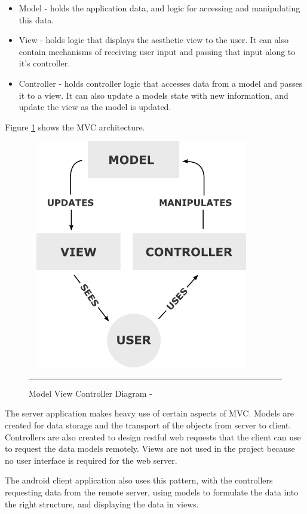 \begin{itemize}
	\item Model - holds the application data, and logic  for accessing and manipulating this data.
	\item View - holds logic that displays the aesthetic view to the user. It can also contain mechanisms of receiving user input and passing that input along to it's controller.
	\item Controller - holds controller logic that accesses data from a model and passes it to a view. It can also update a models state with new information, and update the view as the model is updated.
\end{itemize}

Figure \ref{fig:mvc} shows the MVC architecture.

\begin{figure}[htbp]
	\centering
\includegraphics[width=10cm,height=10cm,keepaspectratio]{Figures/MVC.png}	
		\rule{35em}{0.5pt}
	\caption[Model View Controller Diagram - \cite{wikiMVC}]{Model View Controller Diagram - \cite{wikiMVC}}
	\label{fig:mvc}
\end{figure}

The server application makes heavy use of certain aspects of MVC. Models are created for data storage and the transport of the objects from server to client. Controllers are also created to design restful web requests that the client can use to request the data models remotely. Views are not used in the project because no user interface is required for the web server.

The android client application also uses this pattern, with the controllers requesting data from the remote server, using models to formulate the data into the right structure, and displaying the data in views.

